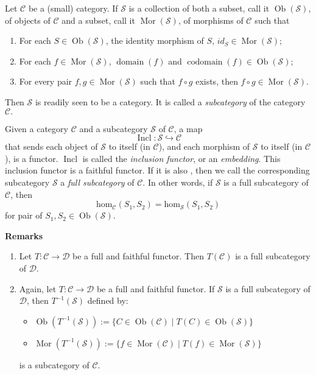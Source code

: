 \documentclass[12pt]{article}
\begin{document}

Let $\mathcal{C}$ be a (small) category.  If $\mathcal{S}$ is a collection of both a subset, call it $\operatorname{Ob}(\mathcal{S})$, of objects of $\mathcal{C}$ and a subset, call it $\operatorname{Mor}(\mathcal{S})$, of morphisms of $\mathcal{C}$ such that
\begin{enumerate}
\item
For each $S\in\operatorname{Ob}(\mathcal{S})$, the identity morphism of $S$, $id_S\in\operatorname{Mor}(\mathcal{S});$
\item
For each $f\in\operatorname{Mor}(\mathcal{S})$, $\operatorname{domain}(f)$ and 
$\operatorname{codomain}(f)\in\operatorname{Ob}(\mathcal{S});$ 
\item
For every pair $f,g\in\operatorname{Mor}(\mathcal{S})$ such that $f\circ g$ exists, then $f\circ g\in\operatorname{Mor}(\mathcal{S}).$ 
\end{enumerate}
Then $\mathcal{S}$ is readily seen to be a category.  It is called a \emph{subcategory} of the category $\mathcal{C}.$

Given a category $\mathcal{C}$ and a subcategory $\mathcal{S}$ of $\mathcal{C}$, a map $$\operatorname{Incl}:\mathcal{S}\hookrightarrow \mathcal{C}$$ that sends each object of $\mathcal{S}$ to itself (in $\mathcal{C}$), and each morphism of $\mathcal{S}$ to itself (in $\mathcal{C}$), is a functor.  $\operatorname{Incl}$ is called the \emph{inclusion functor}, or an \emph{embedding}.  This inclusion functor is a faithful functor.  If it is also , then we call the corresponding subcategory  $\mathcal{S}$ a \emph{full subcategory} of $\mathcal{C}$.  In other words, if $\mathcal{S}$ is a full subcategory of $\mathcal{C}$, then $$\operatorname{hom_{\mathcal{C}}}(S_1,S_2)=\operatorname{hom_{\mathcal{S}}}(S_1,S_2)$$ for pair of $S_1,S_2\in \operatorname{Ob}(\mathcal{S})$.

\textbf{Remarks}
\begin{enumerate}
\item
Let $T:\mathcal{C}\to\mathcal{D}$ be a full and faithful functor.  Then $T(\mathcal{C})$ is a full subcategory of $\mathcal{D}$.
\item
Again, let $T:\mathcal{C}\to\mathcal{D}$ be a full and faithful functor.  If $\mathcal{S}$ is a full subcategory of $\mathcal{D}$, then $T^{-1}(\mathcal{S})$ defined by: 
\begin{itemize}
\item
$\operatorname{Ob}(T^{-1}(\mathcal{S})):=\lbrace C\in\operatorname{Ob}(\mathcal{C})\mid T(C)\in\operatorname{Ob}(\mathcal{S})\rbrace$
\item
$\operatorname{Mor}(T^{-1}(\mathcal{S})):=\lbrace f\in\operatorname{Mor}(\mathcal{C})\mid T(f)\in\operatorname{Mor}(\mathcal{S})\rbrace$
\end{itemize}
is a subcategory of $\mathcal{C}$.
\end{enumerate}
\end{document}
